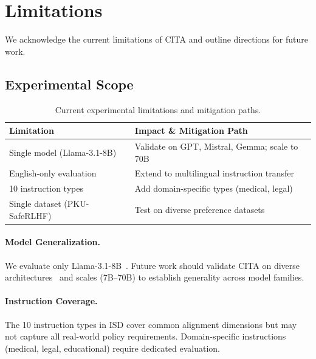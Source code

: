 
\vspace{-2mm}
\section{Limitations}
\label{sec:limitations}

We acknowledge the current limitations of CITA and outline directions for future work.

\vspace{-2mm}
\subsection{Experimental Scope}
\label{sec:experimental_scope}

\begin{table}[H]
\centering
\small
\begin{tabularx}{\columnwidth}{@{}lX@{}}
\toprule
\textbf{Limitation} & \textbf{Impact \& Mitigation Path} \\
\midrule
Single model (Llama-3.1-8B) & Validate on GPT, Mistral, Gemma; scale to 70B \\
\hline
English-only evaluation & Extend to multilingual instruction transfer \\
\hline
10 instruction types & Add domain-specific types (medical, legal) \\
\hline
Single dataset (PKU-SafeRLHF) & Test on diverse preference datasets \\
\bottomrule
\end{tabularx}
\caption{Current experimental limitations and mitigation paths.}
\label{tab:limitations}
\vspace{-4mm}
\end{table}

\paragraph{Model Generalization.} We evaluate only Llama-3.1-8B~\cite{dubey2024llama}. Future work should validate CITA on diverse architectures~\cite{jiang2023mistral,zhang2022opt,openai2023gpt4} and scales (7B--70B) to establish generality across model families.

\paragraph{Instruction Coverage.} The 10 instruction types in ISD cover common alignment dimensions but may not capture all real-world policy requirements. Domain-specific instructions (medical, legal, educational) require dedicated evaluation.

